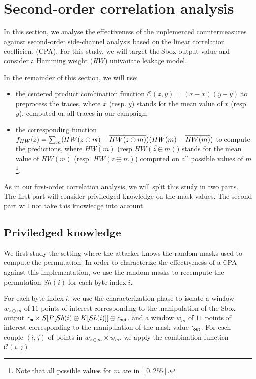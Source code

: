 \section{Second-order correlation analysis}

In this section, we analyse the effectiveness of the implemented countermeasures against second-order side-channel analysis based on the linear correlation coefficient (CPA). For this study, we will target the Sbox output value and consider a Hamming weight ($HW$) univariate leakage model.

In the remainder of this section, we will use:
\begin{itemize}

\item the centered product combination function $\mathcal{C}(x,y) = (x-\bar{x})(y-\bar{y})$ to preprocess the traces, where $\bar{x}$ (resp. $\bar{y}$) stands for the mean value of $x$ (resp. $y$), computed on all traces in our campaign; 

\item the corresponding function $f_{HW}(z) = \sum_m (HW(z \oplus m) - \overline{HW(z\oplus m)})\\(HW(m)-\overline{HW(m)})$ to compute the predictions, where $\overline{HW(m)}$ (resp $\overline{HW(z \oplus m)}$) stands for the mean value of $HW(m)$ (resp. $HW(z\oplus m)$) computed on all possible values of $m$\footnote{Note that all possible values for $m$ are in $[0,255]$.}.
\end{itemize}

As in our first-order correlation analysis, we will split this study in two parts. The first part will consider priviledged knowledge on the mask values. The second part will not take this knowledge into account.

\subsection{Priviledged knowledge}
We first study the setting where the attacker knows the random masks used to compute the permutation. 
In order to characterize the effectiveness of a CPA against this implementation, we use the random masks to recompute the permutation $Sh(i)$ for each byte index $i$.

For each byte index $i$, we use the characterization phase to isolate a window $w_{z\oplus m}$ of $11$ points of interest corresponding to the manipulation of the Sbox output $\mathsf{r_m} \times S[P[Sh(i)\oplus K[Sh(i)]] \oplus \mathsf{r_{out}}$, and a window $w_m$ of $11$ points of interest corresponding to the manipulation of the mask value $\mathsf{r_{out}}$. For each couple $(i,j)$ of points in $w_{z\oplus m} \times w_m$, we apply the combination function $\mathcal{C}(i,j)$.


